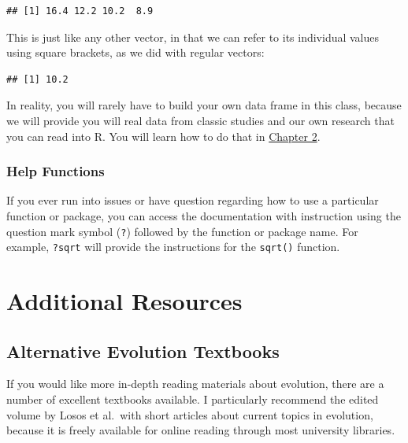 \documentclass[
]{book}
\newenvironment{Shaded}{\begin{snugshade}}{\end{snugshade}}
\newcommand{\DecValTok}[1]{\textcolor[rgb]{0.00,0.00,0.81}{#1}}
\newcommand{\NormalTok}[1]{#1}
\newcommand{\SpecialCharTok}[1]{\textcolor[rgb]{0.00,0.00,0.00}{#1}}
\begin{document}
\begin{verbatim}
## [1] 16.4 12.2 10.2  8.9
\end{verbatim}

This is just like any other vector, in that we can refer to its individual values using square brackets, as we did with regular vectors:

\begin{Shaded}
\end{Shaded}

\begin{verbatim}
## [1] 10.2
\end{verbatim}

In reality, you will rarely have to build your own data frame in this class, because we will provide you will real data from classic studies and our own research that you can read into R. You will learn how to do that in \href{evidence-for-evolution.html\#import-data}{Chapter 2}.

\hypertarget{help-functions}{%
\subsubsection*{Help Functions}\label{help-functions}}

If you ever run into issues or have question regarding how to use a particular function or package, you can access the documentation with instruction using the question mark symbol (\texttt{?}) followed by the function or package name. For example, \texttt{?sqrt} will provide the instructions for the \texttt{sqrt()} function.

\hypertarget{additional-resources}{%
\section{Additional Resources}\label{additional-resources}}

\hypertarget{alternative-evolution-textbooks}{%
\subsection{Alternative Evolution Textbooks}\label{alternative-evolution-textbooks}}

If you would like more in-depth reading materials about evolution, there are a number of excellent textbooks available. I particularly recommend the edited volume by Losos et al.~with short articles about current topics in evolution, because it is freely available for online reading through most university libraries.
\end{document}
